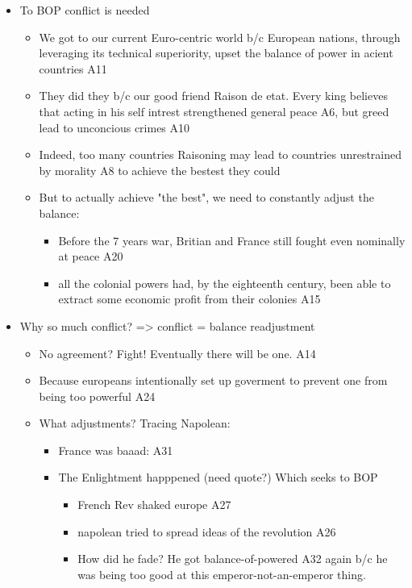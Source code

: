 \documentclass[letterpaper]{article}
\begin{document}
\begin{itemize}
\item To BOP conflict is needed

\begin{itemize}
\item We got to our current Euro-centric world b/c European nations,
through leveraging its technical superiority, upset the balance of
power in acient countries A11
\item They did they b/c our good friend Raison de etat. Every king
believes that acting in his self intrest strengthened general peace
A6, but greed lead to unconcious crimes A10
\item Indeed, too many countries Raisoning may lead to countries
unrestrained by morality A8 to achieve the bestest they could
\item But to actually achieve "the best", we need to constantly adjust the
balance:

\begin{itemize}
\item Before the 7 years war, Britian and France still fought even
nominally at peace A20
\item all the colonial powers had, by the eighteenth century, been able
to extract some economic profit from their colonies A15
\end{itemize}
\end{itemize}

\item Why so much conflict? => conflict = balance readjustment

\begin{itemize}
\item No agreement? Fight! Eventually there will be one. A14
\item Because europeans intentionally set up goverment to prevent one from
being too powerful A24
\item What adjustments? Tracing Napolean:

\begin{itemize}
\item France was baaad: A31
\item The Enlightment happpened (need quote?) Which seeks to BOP

\begin{itemize}
\item French Rev shaked europe A27
\item napolean tried to spread ideas of the revolution A26
\item How did he fade? He got balance-of-powered A32 again b/c he was
being too good at this emperor-not-an-emperor thing.
\end{itemize}
\end{itemize}
\end{itemize}


\end{itemize}
\end{document}
